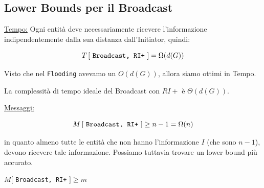 \subsection{Lower Bounds per il Broadcast}
\underline{Tempo:}
Ogni entità deve necessariamente ricevere l'informazione indipendentemente dalla
sua distanza dall'Initiator, quindi:

$$
    T \left[ \text{ \texttt{Broadcast, RI+} } \right] = \Omega(d(G))
$$

Visto che nel \texttt{Flooding} avevamo un $O(d(G))$, allora siamo ottimi in
Tempo.

\begin{theorem}
    La complessità di tempo ideale del Broadcast con $RI+$ è
    $\Theta(d(G))$.
\end{theorem}

\underline{Messaggi:}

$$
    M \left[ \text{ \texttt{Broadcast, RI+} } \right] \geq n-1 = \Omega(n)
$$

in quanto almeno tutte le entità che non hanno l'informazione $I$ (che sono
$n-1$), devono ricevere tale informazione. Possiamo tuttavia trovare un lower
bound più accurato.

\begin{theorem}
    $M[$ \texttt{Broadcast, RI+} $] \geq m$
\end{theorem}

